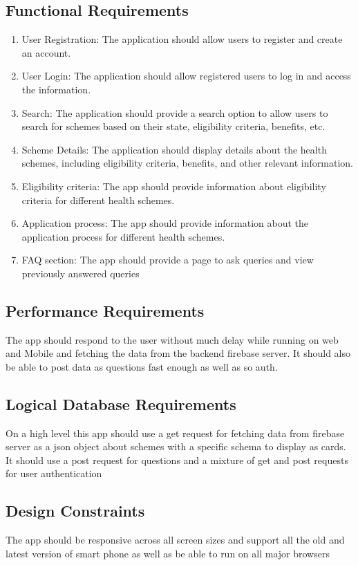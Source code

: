\documentclass{article}
\begin{document}
\subsection{Functional Requirements}
\begin{enumerate}
\item
  User Registration: The application should allow users to register and
  create an account.
\item
  User Login: The application should allow registered users to log in
  and access the information.
\item
  Search: The application should provide a search option to allow users
  to search for schemes based on their state, eligibility criteria,
  benefits, etc.
\item
  Scheme Details: The application should display details about the
  health schemes, including eligibility criteria, benefits, and other
  relevant information.
\item
  Eligibility criteria: The app should provide information about
  eligibility criteria for different health schemes.
\item
  Application process: The app should provide information about the
  application process for different health schemes.
\item
  FAQ section: The app should provide a page to ask queries and view
  previously answered queries
\end{enumerate}

\subsection{Performance Requirements}
The app should respond to the user without much delay while running on
web and Mobile and fetching the data from the backend firebase server.
It should also be able to post data as questions fast enough as well as
so auth.

\subsection{Logical Database Requirements}
On a high level this app should use a get request for fetching data from
firebase server as a json object about schemes with a specific schema to
display as cards. It should use a post request for questions and a
mixture of get and post requests for user authentication

\subsection{Design Constraints}
The app should be responsive across all screen sizes and support all the
old and latest version of smart phone as well as be able to run on all
major browsers
\end{document}
